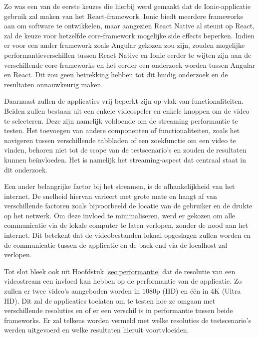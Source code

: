 Zo was een van de eerste keuzes die hierbij werd gemaakt dat de Ionic-applicatie gebruik zal maken van het React-framework. Ionic biedt meerdere frameworks aan om software te ontwikkelen, maar aangezien React Native al steunt op React, zal de keuze voor hetzelfde core-framework mogelijke side effects beperken. Indien er voor een ander framework zoals Angular gekozen zou zijn, zouden mogelijke performantieverschillen tussen React Native en Ionic eerder te wijten zijn aan de verschillende core-frameworks en het eerder een onderzoek worden tussen Angular en React. Dit zou geen betrekking hebben tot dit huidig onderzoek en de resultaten onnauwkeurig maken.

Daarnaast zullen de applicaties vrij beperkt zijn op vlak van functionaliteiten. Beiden zullen bestaan uit een enkele videospeler en enkele knoppen om de video te selecteren. Deze zijn namelijk voldoende om de streaming performantie te testen. Het toevoegen van andere componenten of functionaliteiten, zoals het navigeren tussen verschillende tabbladen of een zoekfunctie om een video te vinden, behoren niet tot de scope van de testscenario's en zouden de resultaten kunnen beïnvloeden. Het is namelijk het streaming-aspect dat centraal staat in dit onderzoek.

Een ander belangrijke factor bij het streamen, is de afhankelijkheid van het internet. De snelheid hiervan varieert met grote mate en hangt af van verschillende factoren zoals bijvoorbeeld de locatie van de gebruiker en de drukte op het netwerk. Om deze invloed te minimaliseren, werd er gekozen om alle communicatie via de lokale computer te laten verlopen, zonder de nood aan het internet. Dit betekent dat de videobestanden lokaal opgeslagen zullen worden en de communicatie tussen de applicatie en de back-end via de localhost zal verlopen.

Tot slot bleek ook uit Hoofdstuk \ref{sec:performantie} dat de resolutie van een videostream een invloed kan hebben op de performantie van de applicatie. Zo zullen er twee video's aangeboden worden in 1080p (HD) en één in 4K (Ultra HD). Dit zal de applicaties toelaten om te testen hoe ze omgaan met verschillende resoluties en of er een verschil is in performantie tussen beide frameworks. Er zal telkens worden vermeld met welke resoluties de testscenario's werden uitgevoerd en welke resultaten hieruit voortvloeiden.


\section{}%
\label{sec:omgeving-opzetten}

